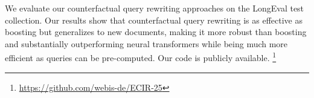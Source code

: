 We evaluate our counterfactual query rewriting approaches on the LongEval test collection. Our results show that counterfactual query rewriting is as effective as boosting but generalizes to new documents,  making it more robust than boosting and substantially outperforming neural transformers while being much more efficient as queries can be pre-computed. Our code is publicly available.%
\footnote{\url{https://github.com/webis-de/ECIR-25}}

